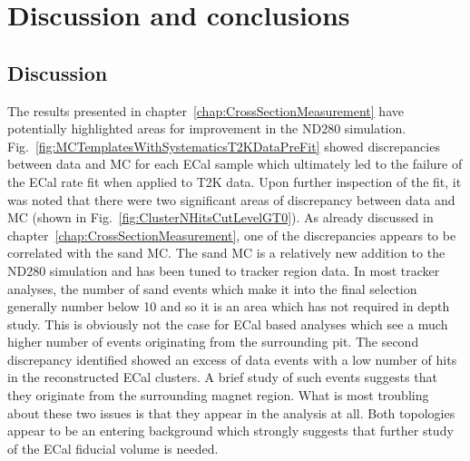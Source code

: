 


\chapter{Discussion and conclusions}
\label{chap:DiscussionAndConclusions}

\section{Discussion}
\label{sec:Discussion}
The results presented in chapter~\ref{chap:CrossSectionMeasurement} have potentially highlighted areas for improvement in the ND280 simulation.  Fig.~\ref{fig:MCTemplatesWithSystematicsT2KDataPreFit} showed discrepancies between data and MC for each ECal sample which ultimately led to the failure of the ECal rate fit when applied to T2K data.  Upon further inspection of the fit, it was noted that there were two significant areas of discrepancy between data and MC (shown in Fig.~\ref{fig:ClusterNHitsCutLevelGT0}).
\newline
\newline
As already discussed in chapter~\ref{chap:CrossSectionMeasurement}, one of the discrepancies appears to be correlated with the sand MC.  The sand MC is a relatively new addition to the ND280 simulation and has been tuned to tracker region data.  In most tracker analyses, the number of sand events which make it into the final selection generally number below 10 and so it is an area which has not required in depth study.  This is obviously not the case for ECal based analyses which see a much higher number of events originating from the surrounding pit.  The second discrepancy identified showed an excess of data events with a low number of hits in the reconstructed ECal clusters.  A brief study of such events suggests that they originate from the surrounding magnet region.  What is most troubling about these two issues is that they appear in the analysis at all.  Both topologies appear to be an entering background which strongly suggests that further study of the ECal fiducial volume is needed.  
